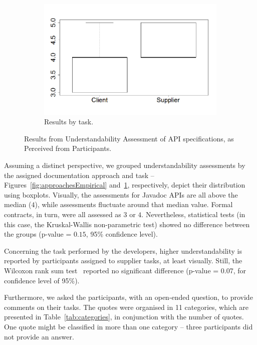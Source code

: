 \begin{figure}
\begin{subfigure}{.33\textwidth}
\includegraphics[width=1\linewidth]{figs/boxplotTasksEmpiricalStudy}
\caption{Results by task.}
\label{fig:tasksEmpirical}
\end{subfigure}
\caption{Results from Understandability Assessment of API specifications, as Perceived from Participants.}
\label{fig:empiricalResults}
\end{figure}

Assuming a distinct perspective, we grouped understandability assessments by the assigned documentation approach and task -- Figures~\ref{fig:approachesEmpirical} and~\ref{fig:tasksEmpirical}, respectively, depict their distribution using boxplots.
Visually, the assessments for Javadoc APIs are all above the median ($4$), while \contractjdoc{} assessments fluctuate around that median value. Formal contracts, in turn, were all assessed as $3$ or $4$.  
Nevertheless, statistical tests (in this case, the Kruskal-Wallis non-parametric test) showed no difference between the groups (p-value = $0.15$, 95\% confidence level).

Concerning the task performed by the developers, higher understandability is reported by participants assigned to supplier tasks, at least visually. Still, the Wilcoxon rank sum test~\cite{statistical} reported no significant difference (p-value = 0.07, for confidence level of 95\%).

Furthermore, we asked the participants, with an open-ended question, to provide comments on their tasks.
The quotes were organised in 11 categories, which are presented in Table~\ref{tab:categories}, in conjunction with the number of quotes. One quote might be classified in more than one category -- three participants did not provide an answer.

